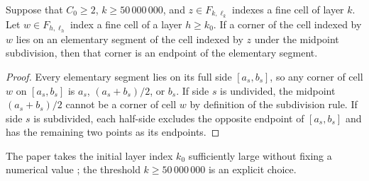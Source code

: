 \begin{lemma}
    \label{thm:area_law_elementary_corner_endpoint}
    \leanok
    Suppose that $C_0\ge2$, $k\ge50\,000\,000$, and $z\in F_{k,\ell_k}$
    indexes a fine cell of layer $k$. Let $w\in F_{h,\ell_h}$ index a fine
    cell of a layer $h\ge k_0$. If a corner of the cell indexed by $w$ lies
    on an elementary segment of the cell indexed by $z$ under the midpoint
    subdivision, then that corner is an endpoint of the elementary segment.
\end{lemma}
\begin{proof}\leanok
    Every elementary segment lies on its full side $[a_s,b_s]$, so any corner
    of cell $w$ on $[a_s,b_s]$ is $a_s$, $(a_s+b_s)/2$, or $b_s$. If side $s$
    is undivided, the midpoint $(a_s+b_s)/2$ cannot be a corner of cell $w$ by
    definition of the subdivision rule. If side $s$ is subdivided, each
    half-side excludes the opposite endpoint of $[a_s,b_s]$ and has the
    remaining two points as its endpoints.
\end{proof}

The paper takes the initial layer index $k_0$ sufficiently large without
fixing a numerical value \cite[Section~11]{OpenAI2026AreaLaw}; the threshold
$k\ge50\,000\,000$ is an explicit choice.
